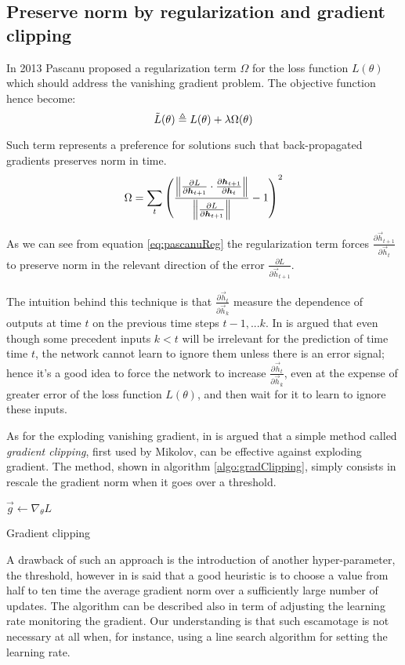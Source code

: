 \subsection{Preserve norm by regularization and gradient clipping} 

In 2013 Pascanu \cite{pascanu} proposed a regularization term $\Omega$ for the loss function $L(\theta)$ which should address the vanishing gradient problem.
The objective function hence become:
\begin{equation}
 \tilde{L}(\theta) \triangleq L(\theta) + \lambda\Omega(\theta)
\end{equation}

Such term represents a preference for solutions such that back-propagated gradients preserves norm in time.
\begin{equation}
\Omega = \sum_t \left( \frac{\left\Vert  \frac{\partial L}{\partial \boldsymbol{h}_{t+1}} \cdot \frac{\partial \boldsymbol{h}_{t+1}}{\partial \boldsymbol{h}_t}  \right\Vert}{\left\Vert \frac{\partial L}{\partial \boldsymbol{h}_{t+1}} \right\Vert} -1  \right)^2 
\label{eq:pascanuReg}
\end{equation}

As we can see from equation \ref{eq:pascanuReg} the regularization term forces $\frac{\partial \vec{h}_{t+1}}{\partial \vec{h}_t}$ to preserve norm in the relevant direction of the error $\frac{\partial L}{\partial \vec{h}_{t+1}}$.

The intuition behind this technique is that $\frac{\partial \vec{h}_{t}}{\partial \vec{h}_k}$ measure the dependence of outputs at time $t$ on the previous time steps $t-1,...k$. In \cite{pascanu} is argued that even though some precedent inputs $k<t$ will be irrelevant for the prediction of time time $t$, the network cannot learn to ignore them unless there is an error signal; hence it's a good idea to force the network to increase $\frac{\partial \vec{h}_{t}}{\partial \vec{h}_k}$, even at the expense of greater error of the loss function $L(\theta)$, and then wait for it to learn to ignore these inputs.

As for the exploding vanishing gradient, in \cite{pascanu} is argued that a simple method called \textit{gradient clipping}, first used by Mikolov\cite{clippingMikolov}, can be effective against exploding gradient. The method, shown in algorithm \ref{algo:gradClipping}, simply consists in rescale the gradient norm when it goes over a threshold.

\begin{algorithm}[]
$\vec{g} \gets \nabla_{\theta} L$\\
\caption{Gradient clipping}
\label{algo:gradClipping}
\end{algorithm}

A drawback of such an approach is the introduction of another hyper-parameter, the threshold, however in \cite{pascanu} is said that a good heuristic
is to choose a value from half to ten time the average gradient norm over a sufficiently large number of updates.
The algorithm can be described also in term of adjusting the learning rate monitoring the gradient. Our understanding is that such escamotage is not necessary at all when, for instance, using a line search algorithm for setting the learning rate.